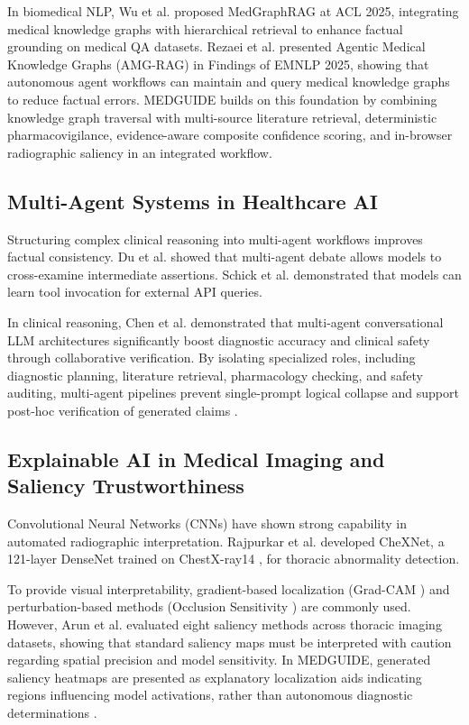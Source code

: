 \documentclass[journal,10pt,twocolumn]{IEEEtran}
\begin{document}
In biomedical NLP, Wu et al. \cite{wu2025medical} proposed MedGraphRAG at ACL 2025, integrating medical knowledge graphs with hierarchical retrieval to enhance factual grounding on medical QA datasets. Rezaei et al. \cite{rezaei2024agentic} presented Agentic Medical Knowledge Graphs (AMG-RAG) in Findings of EMNLP 2025, showing that autonomous agent workflows can maintain and query medical knowledge graphs to reduce factual errors. MEDGUIDE builds on this foundation by combining knowledge graph traversal with multi-source literature retrieval, deterministic pharmacovigilance, evidence-aware composite confidence scoring, and in-browser radiographic saliency in an integrated workflow.

\subsection{Multi-Agent Systems in Healthcare AI}
Structuring complex clinical reasoning into multi-agent workflows improves factual consistency. Du et al. \cite{du2023improving} showed that multi-agent debate allows models to cross-examine intermediate assertions. Schick et al. \cite{schick2024toolformer} demonstrated that models can learn tool invocation for external API queries.

In clinical reasoning, Chen et al. \cite{chen2025enhancing} demonstrated that multi-agent conversational LLM architectures significantly boost diagnostic accuracy and clinical safety through collaborative verification. By isolating specialized roles, including diagnostic planning, literature retrieval, pharmacology checking, and safety auditing, multi-agent pipelines prevent single-prompt logical collapse and support post-hoc verification of generated claims \cite{du2023improving, chen2025enhancing}.

\subsection{Explainable AI in Medical Imaging and Saliency Trustworthiness}
Convolutional Neural Networks (CNNs) have shown strong capability in automated radiographic interpretation. Rajpurkar et al. \cite{rajpurkar2017chexnet} developed CheXNet, a 121-layer DenseNet trained on ChestX-ray14 \cite{wang2017chestx}, for thoracic abnormality detection.

To provide visual interpretability, gradient-based localization (Grad-CAM \cite{selvaraju2017grad}) and perturbation-based methods (Occlusion Sensitivity \cite{zeiler2014visualizing}) are commonly used. However, Arun et al. \cite{arun2021assessing} evaluated eight saliency methods across thoracic imaging datasets, showing that standard saliency maps must be interpreted with caution regarding spatial precision and model sensitivity. In MEDGUIDE, generated saliency heatmaps are presented as explanatory localization aids indicating regions influencing model activations, rather than autonomous diagnostic determinations \cite{arun2021assessing, sendak2020real}.
\end{document}
